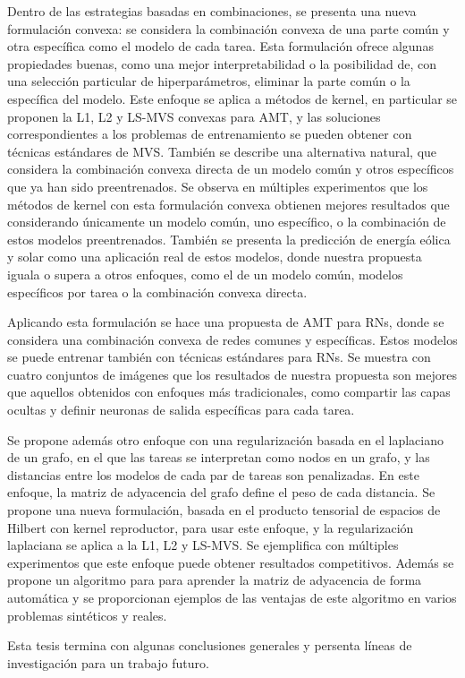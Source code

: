 \documentclass[a4paper, 11pt]{Thesis}  %
\begin{document}
{{Dentro de las estrategias basadas en combinaciones, se presenta una nueva formulación convexa: se considera la combinación convexa de una parte común y otra específica como el modelo de cada tarea. Esta formulación ofrece algunas propiedades buenas, como una mejor interpretabilidad o la posibilidad de, con una selección particular de hiperparámetros, eliminar la parte común o la específica del modelo. Este enfoque se aplica a métodos de kernel, en particular se proponen la L1, L2 y LS-MVS convexas para AMT, y las soluciones correspondientes a los problemas de entrenamiento se pueden obtener con técnicas estándares de MVS. También se describe una alternativa natural, que considera la combinación convexa directa de un modelo común y otros específicos que ya han sido preentrenados. 
Se observa en múltiples experimentos que los métodos de kernel con esta formulación convexa obtienen mejores resultados que considerando únicamente un modelo común, uno específico, o la combinación de estos modelos preentrenados. También se presenta la predicción de energía eólica y solar como una aplicación real de estos modelos, donde nuestra propuesta iguala o supera a otros enfoques, como el de un modelo común, modelos específicos por tarea o la combinación convexa directa.

Aplicando esta formulación se hace una propuesta de AMT para RNs, donde se considera una combinación convexa de redes comunes y específicas. Estos modelos se puede entrenar también con técnicas estándares para RNs. Se muestra con cuatro conjuntos de imágenes que los resultados de nuestra propuesta son mejores que aquellos obtenidos con enfoques más tradicionales, como compartir las capas ocultas y definir neuronas de salida específicas para cada tarea.

Se propone además otro enfoque con una regularización basada en el laplaciano de un grafo, en el que las tareas se interpretan como nodos en un grafo, y las distancias entre los modelos de cada par de tareas son penalizadas. En este enfoque, la matriz de adyacencia del grafo define el peso de cada distancia. Se propone una nueva formulación, basada en el producto tensorial de espacios de Hilbert con kernel reproductor, para usar este enfoque, y la regularización laplaciana se aplica a la L1, L2 y LS-MVS. Se ejemplifica con múltiples experimentos que este enfoque puede obtener resultados competitivos. Además se propone un algoritmo para para aprender la matriz de adyacencia de forma automática y se proporcionan ejemplos de las ventajas de este algoritmo en varios problemas sintéticos y reales.

Esta tesis termina con algunas conclusiones generales y persenta líneas de investigación para un trabajo futuro.
}
}
\clearpage  %
\end{document}

